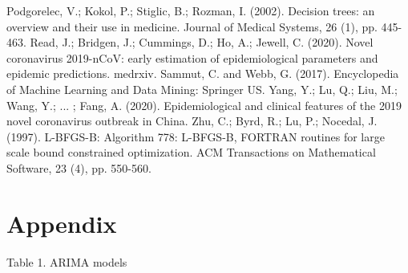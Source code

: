\documentclass[12pt]{article}
\begin{document}
\begin{thebibliography}{99}
 Podgorelec, V.; Kokol, P.; Stiglic, B.; Rozman, I. (2002). Decision trees: an overview and their use in medicine. Journal of Medical Systems, 26 (1), pp. 445-463.
 Read, J.; Bridgen, J.; Cummings, D.; Ho, A.; Jewell, C. (2020). Novel coronavirus 2019-nCoV: early estimation of epidemiological parameters and epidemic predictions. medrxiv.
 Sammut, C. and Webb, G. (2017). Encyclopedia of Machine Learning and Data Mining: Springer US.
 Yang, Y.; Lu, Q.; Liu, M.; Wang, Y.; ... ; Fang, A. (2020). Epidemiological and clinical features of the 2019 novel coronavirus outbreak in China.
 Zhu, C.; Byrd, R.; Lu, P.; Nocedal, J. (1997). L-BFGS-B: Algorithm 778: L-BFGS-B, FORTRAN routines for large scale bound constrained optimization. ACM Transactions on Mathematical Software, 23 (4), pp. 550-560.
\end{thebibliography}

\clearpage

\section*{Appendix} \label{sec:appendixa}

\begin{flushleft}
\centering Table 1. ARIMA models \end{flushleft}
\end{document}

